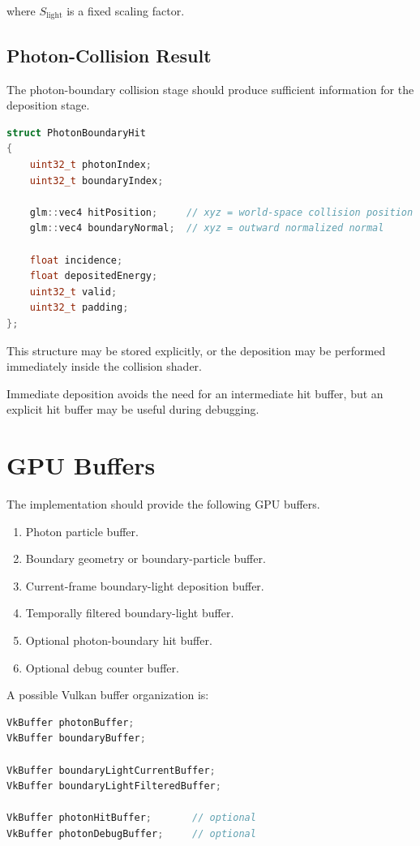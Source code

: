 \documentclass[11pt]{article}
\begin{document}
where $S_{\mathrm{light}}$ is a fixed scaling factor.

\subsection{Photon-Collision Result}

The photon-boundary collision stage should produce sufficient information for
the deposition stage.

\begin{lstlisting}[language=C++]
struct PhotonBoundaryHit
{
    uint32_t photonIndex;
    uint32_t boundaryIndex;

    glm::vec4 hitPosition;     // xyz = world-space collision position
    glm::vec4 boundaryNormal;  // xyz = outward normalized normal

    float incidence;
    float depositedEnergy;
    uint32_t valid;
    uint32_t padding;
};
\end{lstlisting}

This structure may be stored explicitly, or the deposition may be performed
immediately inside the collision shader.

Immediate deposition avoids the need for an intermediate hit buffer, but an
explicit hit buffer may be useful during debugging.

\section{GPU Buffers}

The implementation should provide the following GPU buffers.

\begin{enumerate}
    \item Photon particle buffer.
    \item Boundary geometry or boundary-particle buffer.
    \item Current-frame boundary-light deposition buffer.
    \item Temporally filtered boundary-light buffer.
    \item Optional photon-boundary hit buffer.
    \item Optional debug counter buffer.
\end{enumerate}

A possible Vulkan buffer organization is:

\begin{lstlisting}[language=C++]
VkBuffer photonBuffer;
VkBuffer boundaryBuffer;

VkBuffer boundaryLightCurrentBuffer;
VkBuffer boundaryLightFilteredBuffer;

VkBuffer photonHitBuffer;       // optional
VkBuffer photonDebugBuffer;     // optional
\end{lstlisting}
\end{document}
